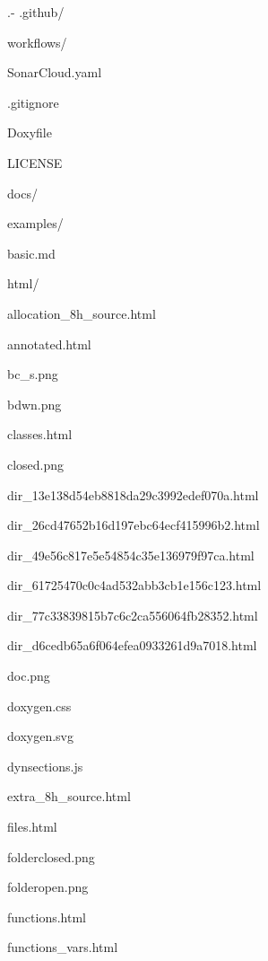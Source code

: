 .-\/ .github/
\begin{DoxyItemize}
\item workflows/
\begin{DoxyItemize}
\item Sonar\+Cloud.\+yaml
\end{DoxyItemize}
\end{DoxyItemize}

.gitignore
\begin{DoxyItemize}
\item Doxyfile
\item LICENSE
\item docs/
\begin{DoxyItemize}
\item examples/
\begin{DoxyItemize}
\item basic.\+md
\end{DoxyItemize}
\item html/
\begin{DoxyItemize}
\item allocation\+\_\+8h\+\_\+source.\+html
\item annotated.\+html
\item bc\+\_\+s.\+png
\item bdwn.\+png
\item classes.\+html
\item closed.\+png
\item dir\+\_\+13e138d54eb8818da29c3992edef070a.\+html
\item dir\+\_\+26cd47652b16d197ebc64ecf415996b2.\+html
\item dir\+\_\+49e56c817e5e54854c35e136979f97ca.\+html
\item dir\+\_\+61725470c0c4ad532abb3cb1e156c123.\+html
\item dir\+\_\+77c33839815b7c6c2ca556064fb28352.\+html
\item dir\+\_\+d6cedb65a6f064efea0933261d9a7018.\+html
\item doc.\+png
\item doxygen.\+css
\item doxygen.\+svg
\item dynsections.\+js
\item extra\+\_\+8h\+\_\+source.\+html
\item files.\+html
\item folderclosed.\+png
\item folderopen.\+png
\item functions.\+html
\item functions\+\_\+vars.\+html

\end{DoxyItemize}
\end{DoxyItemize}
\end{DoxyItemize}
